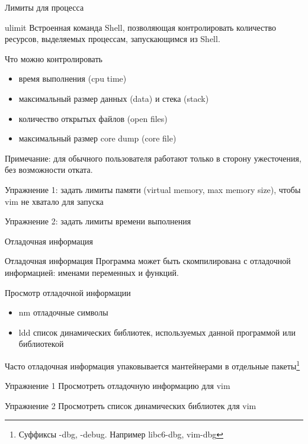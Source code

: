  




\firstframe

\begin{frame}{Лимиты для процесса}
  \begin{block}{\alert{ulimit}}
    Встроенная команда Shell, позволяющая контролировать количество ресурсов, выделяемых процессам, запускающимся из Shell.
  \end{block} \pause

  \begin{block}{Что можно контролировать}
    \begin{itemize}
      \item время выполнения (cpu time)
      \item максимальный размер данных (data) и стека (stack)
      \item количество открытых файлов (open files)
      \item максимальный размер core dump (core file)
    \end{itemize}
  \end{block} 
\small
  Примечание: для обычного пользователя работают только в сторону ужесточения, без возможности отката.
  \pause

  \alert{Упражнение 1}: задать лимиты памяти (virtual memory, max memory size), чтобы vim не хватало для запуска

  \alert{Упражнение 2}: задать лимиты времени выполнения

\end{frame}

\begin{frame}{Отладочная информация}
  \label{debug-info}
  \begin{block}{Отладочная информация}
    Программа может быть скомпилирована с отладочной информацией: именами переменных и функций.
  \end{block}

  \begin{block}{Просмотр отладочной информации}
    \begin{itemize}
      \item \alert{nm} отладочные символы
      \item \alert{ldd} список динамических библиотек, используемых данной программой или библиотекой
    \end{itemize}
  \end{block} 

  Часто отладочная информация упаковывается мантейнерами в отдельные пакеты\footnote{Суффиксы -dbg, -debug. Например \alert{libc6-dbg, vim-dbg} }

  \alert{Упражнение 1} Просмотреть отладочную информацию для vim

  \alert{Упражнение 2} Просмотреть список динамических библиотек для vim
\end{frame}


